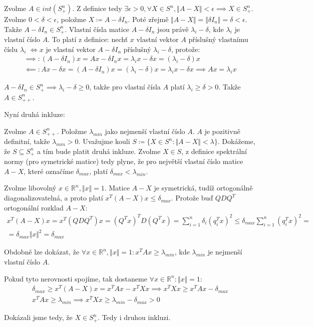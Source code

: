 \documentclass[12pt, a4paper]{article}
\begin{document}
Zvolme $A \in int(S^n_+)$. Z definice tedy  $\exists \epsilon > 0, \forall X \in S^n, \Vert A-X \Vert < \epsilon \implies X \in S^n_+$. Zvolme $0 < \delta < \epsilon$, položme $X \coloneqq  A - \delta I_n$. Poté zřejmě $\Vert A - X \Vert = \Vert \delta I_n \Vert = \delta < \epsilon$. Takže $A-\delta I_n \in S^n_+$. Vlastní čísla matice $A-\delta I_n$ jsou právě $\lambda_i - \delta$, kde $\lambda_i$ je vlastní číslo $A$. To platí z definice: nechť $x$ vlastní vektor $A$ příslušný vlastnímu číslu $\lambda_i$ $\iff x$ je vlastní vektor $A-\delta I_n$ příslušný $\lambda_i - \delta$, protože:
\begin{gather*}
\implies: (A-\delta I_n)x = Ax - \delta I_n x = \lambda_i x - \delta x = (\lambda_i -\delta) x\\
\impliedby: Ax - \delta x = (A-\delta I_n)x = (\lambda_i - \delta)x = \lambda_i x - \delta x \implies Ax = \lambda_i x
\end{gather*}

$A-\delta I_n \in S^n_+ \implies \lambda_i-\delta \geq 0$, takže pro vlastní čísla $A$ platí $\lambda_i \geq \delta > 0$. Takže $A \in S^n_{++}$.

Nyní druhá inkluze:

Zvolme $A \in S^n_{++}$. Položme $\lambda_{min}$ jako nejmenší vlastní číslo $A$. $A$ je pozitivně definitní, takže $\lambda_{min} > 0$. Uvažujme kouli $S \coloneqq \{ X \in S^n: \Vert A-X \Vert < \lambda\}$. Dokážeme, že $S \subseteq S^n_+$ a tím bude platit druhá inkluze. Zvolme $X \in S$, z definice spektrální normy (pro symetrické matice) tedy plyne, že pro největší vlastní číslo matice $A-X$, které označíme $\delta_{max}$, platí $\delta_{max} < \lambda_{min}$. 

Zvolme libovolný $x \in \mathbb{R}^n, \Vert x \Vert = 1$. Matice $A-X$ je symetrická, tudíž ortogonálně diagonalizovatelná, a proto platí $x^T(A-X)x \leq \delta_{max}$. Protože buď $QDQ^T$ ortogonální rozklad $A-X$:
\begin{gather*}
x^T(A-X)x = x^T(QDQ^T)x = (Q^Tx)^TD(Q^Tx) = \sum_{i=1}^n \delta_i (q_i^Tx)^2 \leq  \delta_{max} \sum_{i=1}^n (q_i^Tx)^2 =  \\
= \delta_{max}\Vert x \Vert^2 = \delta_{max}
\end{gather*}

Obdobně lze dokázat, že $\forall x \in \mathbb{R}^n, \Vert x \Vert = 1: x^T A x \geq \lambda_{min}$, kde $\lambda_{min}$ je nejmenší vlastní číslo $A$.

Pokud tyto nerovnosti spojíme, tak dostaneme $\forall x \in \mathbb{R}^n: \Vert x \Vert = 1$:
\begin{gather*}
\delta_{max} \geq x^T(A-X)x = x^TAx - x^TXx \implies x^TXx \geq x^TAx - \delta_{max}\\
x^TAx \geq \lambda_{min} \implies x^TXx \geq \lambda_{min} - \delta_{max} > 0
\end{gather*}

Dokázali jsme tedy, že $X \in S^n_{+}$. Tedy i druhou inkluzi.
\end{document}

